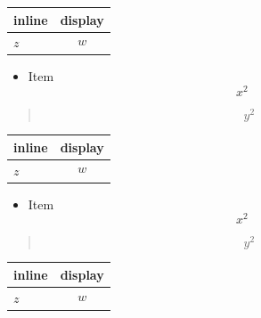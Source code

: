 \par\addvspace{\medskipamount}
\noindent\begin{tabularx}{\linewidth}{@{}>{\raggedright\arraybackslash}X>{\raggedright\arraybackslash}X@{}}
\toprule
inline & display \\
\midrule
$z$ & $$w$$ \\
\bottomrule
\end{tabularx}
\par\addvspace{\medskipamount}
\begin{frame}[t]
\begin{itemize}
\item Item
\[
x^2
\]
\end{itemize}

\begin{quote}
\[
y^2
\]
\end{quote}

\par\addvspace{\medskipamount}
\noindent\begin{tabularx}{\linewidth}{@{}>{\raggedright\arraybackslash}X>{\raggedright\arraybackslash}X@{}}
\toprule
inline & display \\
\midrule
$z$ & $$w$$ \\
\bottomrule
\end{tabularx}
\par\addvspace{\medskipamount}
\end{frame}

\begin{frame}[t]
\begin{itemize}
\item Item
\[
x^2
\]
\end{itemize}

\begin{quote}
\[
y^2
\]
\end{quote}

\par\addvspace{\medskipamount}
\noindent\begin{tabularx}{\linewidth}{@{}>{\raggedright\arraybackslash}X>{\raggedright\arraybackslash}X@{}}
\toprule
inline & display \\
\midrule
$z$ & $$w$$ \\
\bottomrule
\end{tabularx}
\par\addvspace{\medskipamount}
\end{frame}

